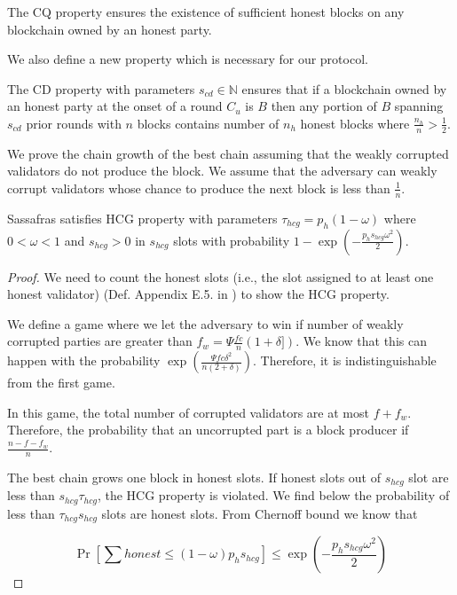 The CQ property ensures the existence of sufficient honest blocks on  any blockchain owned by an honest party.

We also define a new property which is necessary for our protocol.
\begin{definition}
	\label{def:cd}
	The CD property with parameters $s_{cd} \in \mathbb{N}$ ensures that  if a blockchain owned by an honest party at the onset of a round $ C_u $ is $ B $ then any portion of  $B$ spanning $s_{cd}$ prior rounds with $n$ blocks  contains  number of $n_h$ honest blocks  where $\frac{n_h}{n}> \frac{1}{2}$.
\end{definition}


We prove the chain growth of the best chain assuming that the weakly corrupted validators do not produce the block. We assume that the adversary can weakly corrupt validators whose chance to produce the next block is less than $ \frac{1}{n} $.


\begin{theorem}
	Sassafras satisfies HCG property with parameters $\tau_{hcg} = p_h(1-\omega)$ where $0 < \omega < 1$ and $s_{hcg} > 0$ in $s_{hcg}$ slots  with probability $1-\exp(-\frac{ p_h s_{hcg} \omega^2}{2})$.
\end{theorem}
\begin{proof}
	We need to count the honest slots (i.e., the slot assigned to at least one honest validator) (Def. Appendix E.5. in \cite{genesis}) to show the HCG property.
	
	We define a game where we let the adversary to win if number of weakly corrupted parties are greater than $ f_w = \Psi\frac{fc}{n}(1+\delta]) $. We know that this can happen with the probability $ \exp(\frac{\Psi f c \delta^2}{n(2+\delta)}) $. Therefore, it is indistinguishable from the first game.
	
	In this game, the total number of corrupted validators are at most $ f + f_w $. Therefore, the probability that an uncorrupted part is a block producer if $ \frac{n - f - f_w}{n} $.
	
	
	The best chain grows one block in honest slots. If honest slots out of $s_{hcg}$ slot are less than $s_{hcg}\tau_{hcg}$, the HCG property is violated. 
	We find below the probability of less than $\tau_{hcg} s_{hcg}$ slots are honest slots. From Chernoff bound we know that
	
	$$\Pr[\sum honest \leq  (1-\omega) p_h s_{hcg}] \leq \exp(-\frac{p_h s_{hcg} \omega^2}{2})$$
	
\end{proof}
